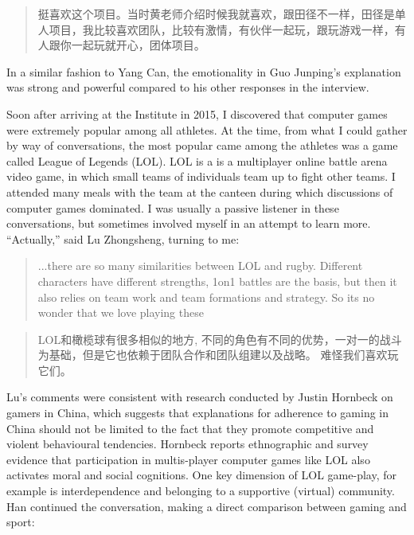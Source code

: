 \begin{CJK}{UTF8}{gbsn}
  \begin{quotation}
    	挺喜欢这个项目。当时黄老师介绍时候我就喜欢，跟田径不一样，田径是单人项目，我比较喜欢团队，比较有激情，有伙伴一起玩，跟玩游戏一样，有人跟你一起玩就开心，团体项目。
  \end{quotation}

In a similar fashion to Yang Can, the emotionality in Guo Junping's explanation was strong and powerful compared to his other responses in the interview.

Soon after arriving at the Institute in 2015, I discovered that computer games were extremely popular among all athletes.  At the time, from what I could gather by way of conversations, the most popular came among the athletes was a game called League of Legends (LOL). LOL is a is a multiplayer online battle arena video game, in which small teams of individuals team up to fight other teams.  I attended many meals with the team at the canteen during which discussions of computer games dominated. I was usually a passive listener in these conversations, but sometimes involved myself in an attempt to learn more.  ``Actually,'' said Lu Zhongsheng, turning to me:

  \begin{quotation}
    ...there are so many similarities between LOL and rugby.  Different characters have different strengths, 1on1 battles are the basis, but then it also relies on team work and team formations and strategy.  So its no wonder that we love playing these
  \end{quotation}

  \begin{quotation}
    LOL和橄榄球有很多相似的地方, 不同的角色有不同的优势，一对一的战斗为基础，但是它也依赖于团队合作和团队组建以及战略。 难怪我们喜欢玩它们。
  \end{quotation}

  Lu's comments were consistent with research conducted by Justin Hornbeck on gamers in China, which suggests that explanations for adherence to gaming in China should not be limited to the fact that they promote competitive and violent behavioural tendencies. Hornbeck reports ethnographic and survey evidence that participation in multis-player computer games like LOL also activates moral and social cognitions. One key dimension of LOL game-play, for example is interdependence and belonging to a supportive (virtual) community. Han continued the conversation, making a direct comparison between gaming and sport:


\end{CJK}
